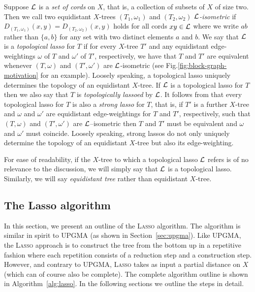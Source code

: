 Suppose ${\mathcal L}$ is a {\em set of cords} on $X$, that is, a collection of subsets
of $X$ of size two. Then we call two equidistant $X$-trees $(T_1,\omega_1)$
and $(T_2,\omega_2)$ {\em ${\mathcal L}$-isometric} if
$D_{(T_1,\omega_1)}(x,y)=D_{(T_2,\omega_2)}(x,y)$ holds for all cords $xy\in
{\mathcal L}$ where we write $ab$ rather than $\{a,b\}$ for any set with two distinct
elements $a$ and $b$.  We say that ${\mathcal L}$ is a {\em topological lasso} for $T$
if for every $X$-tree $T'$ and any equidistant edge-weightings $\omega$ of $T$
and $\omega'$ of $T'$, respectively, we have that $T$ and $T'$ are equivalent
whenever $(T,\omega)$ and $(T',\omega')$ are ${\mathcal L}$-isometric (see
Fig.\ref{fig:block-graph-motivation} for an example).  Loosely speaking, a
topological lasso uniquely determines the topology of an equidistant
$X$-tree. If ${\mathcal L}$ is a topological lasso for $T$ then we also say that $T$ is
{\em topologically lassoed} by ${\mathcal L}$.  It follows from \cite{huber13lassoing}
that every topological lasso for $T$ is also a {\em strong lasso} for $T$,
that is, if $T'$ is a further $X$-tree and $\omega$ and $\omega'$ are
equidistant edge-weightings for $T$ and $T'$, respectively, such that
$(T,\omega)$ and $(T',\omega')$ are ${\mathcal L}$--isometric then $T$ and $T'$ must be
equivalent and $\omega$ and $\omega'$ must coincide. Loosely speaking, strong
lassos do not only uniquely determine the topology of an equidistant $X$-tree
but also its edge-weighting.
 
For ease of readability, if the $X$-tree to which a topological lasso ${\mathcal L}$
refers is of no relevance to the discussion, we will simply say that ${\mathcal L}$ is
a topological lasso.  Similarly, we will say {\em equidistant tree} rather
than equidistant $X$-tree.

\subsection{The {\sc Lasso} algorithm}
\label{sec:sc-lasso-algorithm}

In this section, we present an outline of the \textsc{Lasso} algorithm.  The
algorithm is similar in spirit to \textsc{UPGMA} (as shown in
Section~\ref{sec:upgma}).  Like \textsc{UPGMA}, the \textsc{Lasso} approach is to
construct the tree from the bottom up in a repetitive fashion where each
repetition consists of a reduction step and a construction step.  However, and
contrary to {\sc UPGMA}, \textsc{Lasso} takes as input a partial distance on
$X$ (which can of course also be complete).  The complete algorithm outline is
shown in Algorithm~\ref{alg:lasso}.  In the following sections we outline the
steps in detail.

